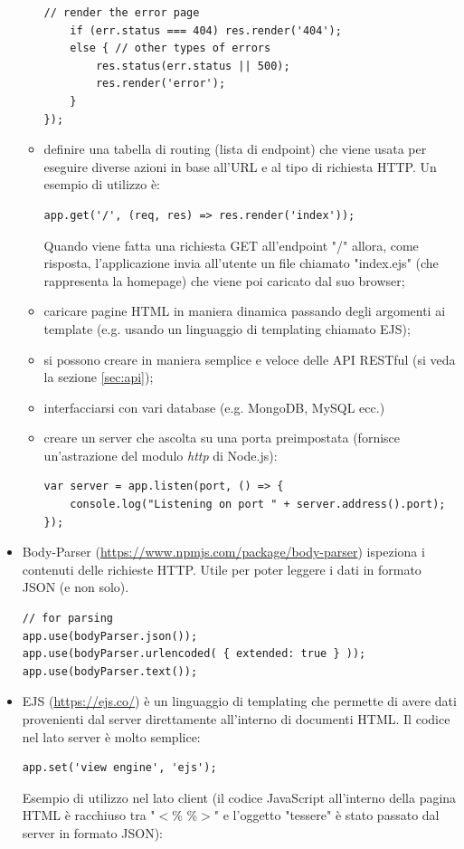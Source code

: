 \documentclass[12pt]{report}
\begin{document}
\begin{itemize}
\begin{itemize}
\begin{lstlisting}
// render the error page
	if (err.status === 404) res.render('404');
	else { // other types of errors
		res.status(err.status || 500);
		res.render('error');
	}
});
\end{lstlisting}
		\item definire una tabella di routing (lista di endpoint) che viene usata per eseguire diverse azioni in base all'URL e al tipo di richiesta HTTP. Un esempio di utilizzo è: 	
\begin{lstlisting}
app.get('/', (req, res) => res.render('index'));
\end{lstlisting}
		Quando viene fatta una richiesta GET all'endpoint "/" allora, come risposta, l'applicazione invia all'utente un file chiamato "index.ejs" (che rappresenta la homepage) che viene poi caricato dal suo browser;
		\item caricare pagine HTML in maniera dinamica passando degli argomenti ai template (e.g. usando un linguaggio di templating chiamato EJS);
		\item si possono creare in maniera semplice e veloce delle API RESTful (si veda la sezione \ref{sec:api});
		\item interfacciarsi con vari database (e.g. MongoDB, MySQL ecc.)
		\item creare un server che ascolta su una porta preimpostata (fornisce un'astrazione del modulo \emph{http} di Node.js):
\begin{lstlisting}
var server = app.listen(port, () => {
	console.log("Listening on port " + server.address().port);
});
\end{lstlisting}   
	\end{itemize}
	\item Body-Parser (\url{https://www.npmjs.com/package/body-parser}) ispeziona i contenuti delle richieste HTTP. Utile per poter leggere i dati in formato JSON (e non solo). 
\begin{lstlisting}
// for parsing
app.use(bodyParser.json()); 
app.use(bodyParser.urlencoded( { extended: true } )); 
app.use(bodyParser.text()); 
\end{lstlisting}
	\item EJS (\url{https://ejs.co/}) è un linguaggio di templating che permette di avere dati provenienti dal server direttamente all'interno di documenti HTML. Il codice nel lato server è molto semplice: 
\begin{lstlisting}
app.set('view engine', 'ejs');
\end{lstlisting}
Esempio di utilizzo nel lato client (il codice JavaScript all'interno della pagina HTML è racchiuso tra "$<$\% \%$>$" e l'oggetto "tessere" è stato passato dal server in formato JSON):

\end{itemize}
\end{document}
